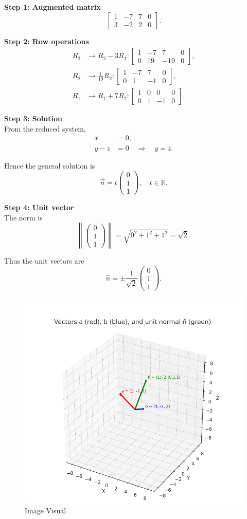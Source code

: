 \documentclass[journal]{IEEEtran}
\begin{document}
\textbf{Step 1: Augmented matrix}
\[
\left[\begin{array}{ccc|c}
1 & -7 & 7 & 0\\
3 & -2 & 2 & 0
\end{array}\right].
\]

\textbf{Step 2: Row operations}
\begin{align}
R_2 &\to R_2 - 3R_1:
\left[\begin{array}{ccc|c}
1 & -7 & 7 & 0\\
0 & 19 & -19 & 0
\end{array}\right], \\[6pt]
R_2 &\to \tfrac{1}{19}R_2:
\left[\begin{array}{ccc|c}
1 & -7 & 7 & 0\\
0 & 1 & -1 & 0
\end{array}\right], \\[6pt]
R_1 &\to R_1 + 7R_2:
\left[\begin{array}{ccc|c}
1 & 0 & 0 & 0\\
0 & 1 & -1 & 0
\end{array}\right].
\end{align}

\textbf{Step 3: Solution}\\
From the reduced system,
\begin{align}
x &= 0, \\
y - z &= 0 \quad \Rightarrow \quad y=z.
\end{align}

Hence the general solution is
\[
\vec{n} = t \begin{pmatrix}0\\1\\1\end{pmatrix}, \quad t \in \mathbb{R}.
\]

\textbf{Step 4: Unit vector}\\
The norm is
\[
\left\|\begin{pmatrix}0\\1\\1\end{pmatrix}\right\| = \sqrt{0^2+1^2+1^2} = \sqrt{2}.
\]

Thus the unit vectors are
\[
\hat{n} = \pm \frac{1}{\sqrt{2}} \begin{pmatrix}0\\1\\1\end{pmatrix}.
\]


\begin{figure}[H]
    \centering
    \includegraphics[width=0.75\columnwidth]{figs/image.png}
    \caption{Image Visual}
    \label{fig:figs/image.png}
\end{figure}
  
\end{document}
